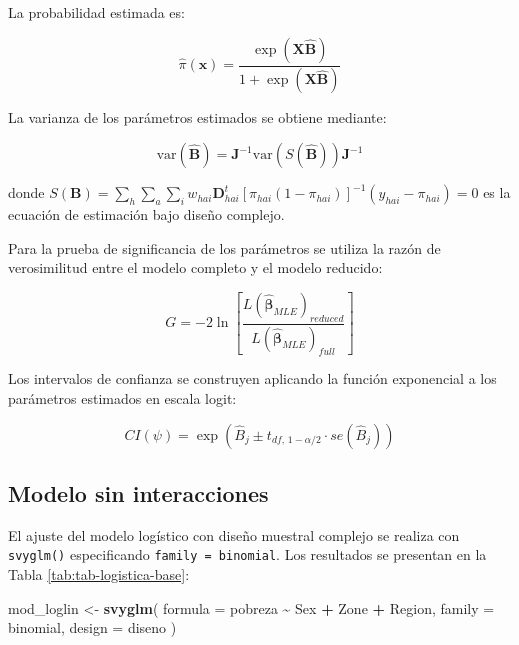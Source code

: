 \documentclass[
  spanish,
  12pt,
]{book}
\newenvironment{Shaded}{\begin{snugshade}}{\end{snugshade}}
\newcommand{\AttributeTok}[1]{\textcolor[rgb]{0.13,0.29,0.53}{#1}}
\newcommand{\FunctionTok}[1]{\textcolor[rgb]{0.13,0.29,0.53}{\textbf{#1}}}
\newcommand{\NormalTok}[1]{#1}
\newcommand{\OtherTok}[1]{\textcolor[rgb]{0.56,0.35,0.01}{#1}}
\newcommand{\SpecialCharTok}[1]{\textcolor[rgb]{0.81,0.36,0.00}{\textbf{#1}}}
\begin{document}
La probabilidad estimada es:

\[
\hat{\pi}(\boldsymbol{x}) = \frac{\exp(\boldsymbol{X\hat{B}})}{1 + \exp(\boldsymbol{X\hat{B}})}
\]

La varianza de los parámetros estimados se obtiene mediante:

\[
\text{var}(\hat{\boldsymbol{B}}) = \boldsymbol{J}^{-1} \text{var}(S(\hat{\boldsymbol{B}})) \boldsymbol{J}^{-1}
\]

donde \(S(\boldsymbol{B}) = \sum_h \sum_a \sum_i w_{hai} \boldsymbol{D}_{hai}^t [\pi_{hai}(1-\pi_{hai})]^{-1} (y_{hai} - \pi_{hai}) = 0\) es la ecuación de estimación bajo diseño complejo.

Para la prueba de significancia de los parámetros se utiliza la razón de verosimilitud entre el modelo completo y el modelo reducido:

\[
G = -2 \ln\left[\frac{L(\hat{\boldsymbol{\beta}}_{MLE})_{reduced}}{L(\hat{\boldsymbol{\beta}}_{MLE})_{full}}\right]
\]

Los intervalos de confianza se construyen aplicando la función exponencial a los parámetros estimados en escala logit:

\[
CI(\psi) = \exp\left(\hat{B}_j \pm t_{df,\, 1-\alpha/2} \cdot se(\hat{B}_j)\right)
\]

\subsection{Modelo sin interacciones}\label{modelo-sin-interacciones}

El ajuste del modelo logístico con diseño muestral complejo se realiza con \texttt{svyglm()} especificando \texttt{family\ =\ binomial}. Los resultados se presentan en la Tabla \ref{tab:tab-logistica-base}:

\begin{Shaded}
\begin{Highlighting}[]
\NormalTok{mod\_loglin }\OtherTok{\textless{}{-}} \FunctionTok{svyglm}\NormalTok{(}
  \AttributeTok{formula =}\NormalTok{ pobreza }\SpecialCharTok{\textasciitilde{}}\NormalTok{ Sex }\SpecialCharTok{+}\NormalTok{ Zone }\SpecialCharTok{+}\NormalTok{ Region,}
  \AttributeTok{family  =}\NormalTok{ binomial,}
  \AttributeTok{design  =}\NormalTok{ diseno}
\NormalTok{)}
\end{Highlighting}
\end{Shaded}
\end{document}
